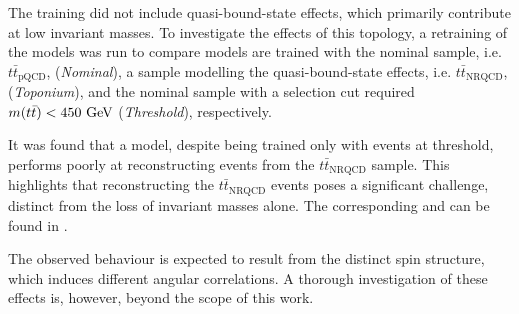The training did not include quasi-bound-state effects, which primarily contribute at low invariant masses. To investigate the effects of this topology, a retraining of the models was run to compare models are trained with the nominal sample, i.e. $t\bar{t}_{\text{pQCD}}$, (\textit{Nominal}), a sample modelling the quasi-bound-state effects, i.e. $t\bar{t}_{\text{NRQCD}}$, (\textit{Toponium}), and the nominal sample with a selection cut required $m(t\bar{t})<450~\GeV$ (\textit{Threshold}), respectively.

It was found that a model, despite being trained only with events at threshold, performs poorly at reconstructing events from the $t\bar{t}_{\text{NRQCD}}$ sample. This highlights that reconstructing the $t\bar{t}_{\text{NRQCD}}$ events poses a significant challenge, distinct from the loss of invariant masses alone. The corresponding  and  can be found in .

The observed behaviour is expected to result from the distinct spin structure, which induces different angular correlations. A thorough investigation of these effects is, however, beyond the scope of this work.

